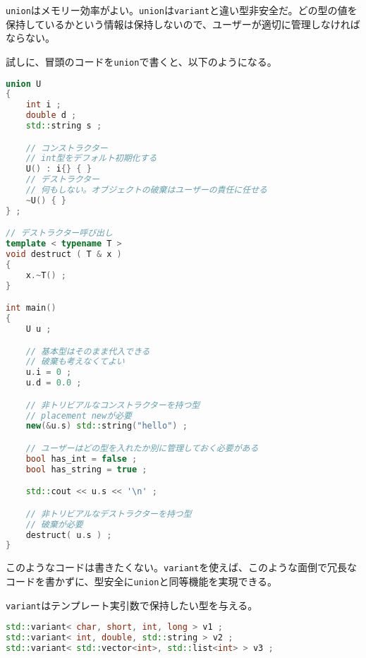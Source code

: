 \lstinline!union!はメモリー効率がよい。\lstinline!union!は\lstinline!variant!と違い型非安全だ。どの型の値を保持しているかという情報は保持しないので、ユーザーが適切に管理しなければならない。

試しに、冒頭のコードを\lstinline!union!で書くと、以下のようになる。

\begin{lstlisting}[language=C++]
union U
{
    int i ;
    double d ;
    std::string s ;

    // コンストラクター
    // int型をデフォルト初期化する
    U() : i{} { }
    // デストラクター
    // 何もしない。オブジェクトの破棄はユーザーの責任に任せる
    ~U() { }
} ;

// デストラクター呼び出し
template < typename T >
void destruct ( T & x )
{
    x.~T() ;
}

int main()
{
    U u ;

    // 基本型はそのまま代入できる
    // 破棄も考えなくてよい
    u.i = 0 ;
    u.d = 0.0 ;

    // 非トリビアルなコンストラクターを持つ型
    // placement newが必要
    new(&u.s) std::string("hello") ;

    // ユーザーはどの型を入れたか別に管理しておく必要がある
    bool has_int = false ;
    bool has_string = true ;

    std::cout << u.s << '\n' ;

    // 非トリビアルなデストラクターを持つ型
    // 破棄が必要
    destruct( u.s ) ;
}
\end{lstlisting}

このようなコードは書きたくない。\lstinline!variant!を使えば、このような面倒で冗長なコードを書かずに、型安全に\lstinline!union!と同等機能を実現できる。

%

\lstinline!variant!はテンプレート実引数で保持したい型を与える。

\begin{lstlisting}[language=C++]
std::variant< char, short, int, long > v1 ;
std::variant< int, double, std::string > v2 ;
std::variant< std::vector<int>, std::list<int> > v3 ;
\end{lstlisting}

%

%

